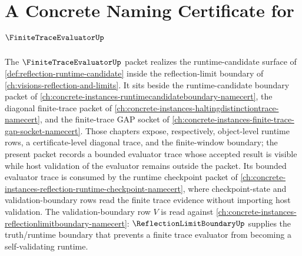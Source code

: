 \chapter{A Concrete Naming Certificate for $\FiniteTraceEvaluatorUp$}
\label{ch:concrete-instances-finitetraceevaluator-namecert}

The $\FiniteTraceEvaluatorUp$ packet realizes the runtime-candidate surface of \autoref{def:reflection-runtime-candidate} inside the reflection-limit boundary of \autoref{ch:visions-reflection-and-limits}. It sits beside the runtime-candidate boundary packet of \autoref{ch:concrete-instances-runtimecandidateboundary-namecert}, the diagonal finite-trace packet of \autoref{ch:concrete-instances-haltingdistinctiontrace-namecert}, and the finite-trace GAP socket of \autoref{ch:concrete-instances-finite-trace-gap-socket-namecert}. Those chapters expose, respectively, object-level runtime rows, a certificate-level diagonal trace, and the finite-window boundary; the present packet records a bounded evaluator trace whose accepted result is visible while host validation of the evaluator remains outside the packet.
Its bounded evaluator trace is consumed by the runtime checkpoint packet of \autoref{ch:concrete-instances-reflection-runtime-checkpoint-namecert}, where checkpoint-state and validation-boundary rows read the finite trace evidence without importing host validation.
The validation-boundary row $V$ is read against \autoref{ch:concrete-instances-reflectionlimitboundary-namecert}: $\ReflectionLimitBoundaryUp$ supplies the truth/runtime boundary that prevents a finite trace evaluator from becoming a self-validating runtime.


